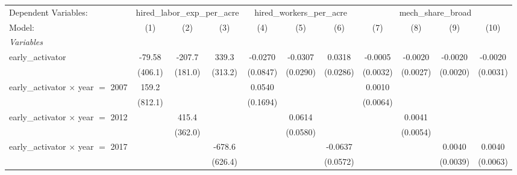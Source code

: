 
\begingroup
\centering
\begin{tabular}{lcccccccccc}
   \tabularnewline \midrule \midrule
   Dependent Variables: & \multicolumn{3}{c}{hired\_labor\_exp\_per\_acre} & \multicolumn{3}{c}{hired\_workers\_per\_acre} & \multicolumn{4}{c}{mech\_share\_broad}\\
   Model:                                    & (1)                   & (2)                   & (3)     & (4)                  & (5)                   & (6)                   & (7)                   & (8)      & (9)      & (10)\\  
   \midrule
   \emph{Variables}\\
   early\_activator                          & -79.58                & -207.7                & 339.3   & -0.0270              & -0.0307               & 0.0318                & -0.0005               & -0.0020  & -0.0020  & -0.0020\\   
                                             & (406.1)               & (181.0)               & (313.2) & (0.0847)             & (0.0290)              & (0.0286)              & (0.0032)              & (0.0027) & (0.0020) & (0.0031)\\   
   early\_activator $\times$ year $=$ 2007   & 159.2                 &                       &         & 0.0540               &                       &                       & 0.0010                &          &          &   \\   
                                             & (812.1)               &                       &         & (0.1694)             &                       &                       & (0.0064)              &          &          &   \\   
   early\_activator $\times$ year $=$ 2012   &                       & 415.4                 &         &                      & 0.0614                &                       &                       & 0.0041   &          &   \\   
                                             &                       & (362.0)               &         &                      & (0.0580)              &                       &                       & (0.0054) &          &   \\   
   early\_activator $\times$ year $=$ 2017   &                       &                       & -678.6  &                      &                       & -0.0637               &                       &          & 0.0040   & 0.0040\\   
                                             &                       &                       & (626.4) &                      &                       & (0.0572)              &                       &          & (0.0039) & (0.0063)\\   

\end{tabular}
